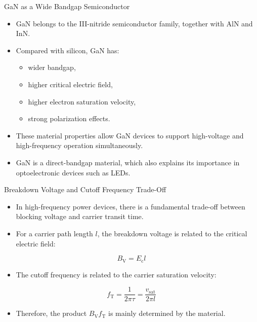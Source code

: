 \begin{frame}{GaN as a Wide Bandgap Semiconductor}

\begin{itemize}
    \item GaN belongs to the III-nitride semiconductor family, together with AlN and InN.
    \item Compared with silicon, GaN has:
    \begin{itemize}
        \item wider bandgap,
        \item higher critical electric field,
        \item higher electron saturation velocity,
        \item strong polarization effects.
    \end{itemize}

    \item These material properties allow GaN devices to support high-voltage and high-frequency operation simultaneously.
    \item GaN is a direct-bandgap material, which also explains its importance in optoelectronic devices such as LEDs.
\end{itemize}

\end{frame}


\begin{frame}{Breakdown Voltage and Cutoff Frequency Trade-Off}

\begin{itemize}
    \item In high-frequency power devices, there is a fundamental trade-off between blocking voltage and carrier transit time.
    \item For a carrier path length $l$, the breakdown voltage is related to the critical electric field:
\end{itemize}

\begin{equation}
B_{\mathrm{V}} = E_{\mathrm{c}} l
\end{equation}

\begin{itemize}
    \item The cutoff frequency is related to the carrier saturation velocity:
\end{itemize}

\begin{equation}
f_{\mathrm{T}} = \frac{1}{2\pi \tau}
= \frac{v_{\mathrm{sat}}}{2\pi l}
\end{equation}

\begin{itemize}
    \item Therefore, the product $B_{\mathrm{V}} f_{\mathrm{T}}$ is mainly determined by the material.
\end{itemize}

\end{frame}


